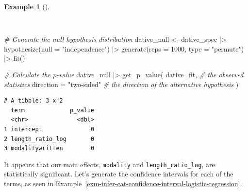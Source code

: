 \documentclass[
  letterpaper,
  krantz1]{latex/krantz-mod}
\newenvironment{Shaded}{\begin{snugshade}}{\end{snugshade}}
\newcommand{\AttributeTok}[1]{\textcolor[rgb]{0.00,0.00,0.00}{#1}}
\newcommand{\CommentTok}[1]{\textcolor[rgb]{0.00,0.00,0.00}{\textit{#1}}}
\newcommand{\DecValTok}[1]{\textcolor[rgb]{0.00,0.00,0.00}{#1}}
\newcommand{\FunctionTok}[1]{\textcolor[rgb]{0.00,0.00,0.00}{#1}}
\newcommand{\NormalTok}[1]{\textcolor[rgb]{0.00,0.00,0.00}{#1}}
\newcommand{\OtherTok}[1]{\textcolor[rgb]{0.00,0.00,0.00}{#1}}
\newcommand{\SpecialCharTok}[1]{\textcolor[rgb]{0.00,0.00,0.00}{#1}}
\newcommand{\StringTok}[1]{\textcolor[rgb]{0.00,0.00,0.00}{#1}}
\theoremstyle{definition}
\newtheorem{example}{Example}[chapter]
\theoremstyle{definition}
\theoremstyle{remark}
\begin{document}
\begin{example}[]\protect\hypertarget{exm-infer-cat-null-hypothesis-logistic-regression}{}\label{exm-infer-cat-null-hypothesis-logistic-regression}

~

\begin{Shaded}
\begin{Highlighting}[numbers=left,,]
\CommentTok{\# Generate the null hypothesis distribution}
\NormalTok{dative\_null }\OtherTok{\textless{}{-}}
\NormalTok{  dative\_spec }\SpecialCharTok{|\textgreater{}}
  \FunctionTok{hypothesize}\NormalTok{(}\AttributeTok{null =} \StringTok{"independence"}\NormalTok{) }\SpecialCharTok{|\textgreater{}}
  \FunctionTok{generate}\NormalTok{(}\AttributeTok{reps =} \DecValTok{1000}\NormalTok{, }\AttributeTok{type =} \StringTok{"permute"}\NormalTok{) }\SpecialCharTok{|\textgreater{}}
  \FunctionTok{fit}\NormalTok{()}

\CommentTok{\# Calculate the $p${-}value}
\NormalTok{dative\_null }\SpecialCharTok{|\textgreater{}}
  \FunctionTok{get\_p\_value}\NormalTok{(}
\NormalTok{    dative\_fit, }\CommentTok{\# the observed statistics}
    \AttributeTok{direction =} \StringTok{"two{-}sided"} \CommentTok{\# the direction of the alternative hypothesis}
\NormalTok{  )}
\end{Highlighting}
\end{Shaded}

\begin{verbatim}
# A tibble: 3 x 2
  term             p_value
  <chr>              <dbl>
1 intercept              0
2 length_ratio_log       0
3 modalitywritten        0
\end{verbatim}

\end{example}

It appears that our main effects, \texttt{modality} and
\texttt{length\_ratio\_log}, are statistically significant. Let's
generate the confidence intervals for each of the terms, as seen in
Example~\ref{exm-infer-cat-confidence-interval-logistic-regression}.
\end{document}
